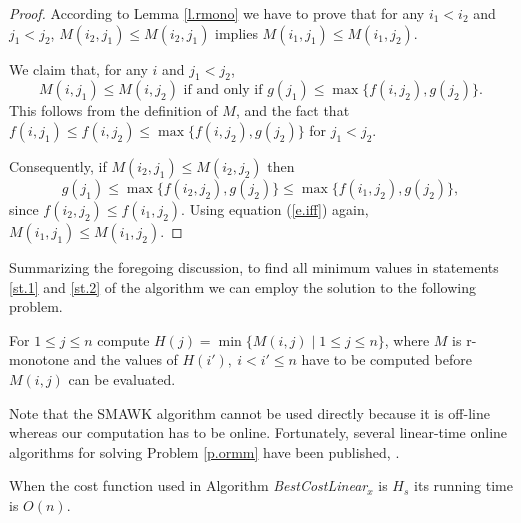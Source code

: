 \begin{proof}
	According to Lemma \ref{l.rmono} we have to prove that for any $i_1<i_2$ and $j_1<j_2$,
	 $M(i_2,j_1)\leq M(i_2,j_1)$ implies $M(i_1,j_1)\leq M(i_1,j_2)$.

We claim that, for any $i$ and  $j_1<j_2$, 
\begin{equation}\label{e.iff}
M(i,j_1)\leq M(i,j_2) \mbox{ if and only if }  g(j_1)\leq \max \{ f(i, j_2),g(j_2)\}. 
\end{equation}
This follows from the definition of $M$, and the fact that 
 $f(i, j_1)\leq f(i, j_2)\leq \max \{ f(i, j_2),g(j_2)\} $ for $j_1 < j_2$.

Consequently,  if $M(i_2,j_1)\leq M(i_2,j_2)$ then
$$ g(j_1)\leq \max \{ f(i_2,j_2), g( j_2)\}\leq \max \{ f(i_1,j_2), g( j_2)\},$$
since $ f(i_2, j_2) \leq f(i_1, j_2)$.
Using equation (\ref{e.iff}) again, $M(i_1,j_1)\leq M(i_1,j_2)$.
\end{proof}
Summarizing the foregoing discussion, to find all minimum values in statements \ref{st.1} and \ref{st.2} of the algorithm we can employ the solution to the following problem.
\begin{problem}\label{p.ormm}
		For $1\leq j \leq n$ compute $H(j)=\min \{M(i,j) \mid 1\leq j \leq n\}$, where 
		$M$ is r-monotone and
	the values of $H(i'),\ i < i' \leq n$ have to be computed before $M(i,j)$ can be evaluated.
\end{problem}
Note that the SMAWK algorithm cannot
be used directly because it is off-line whereas our computation has to be online.
Fortunately, several linear-time online algorithms for solving Problem \ref{p.ormm} have been published, 
\cite{klawe89,larmore91,galil92,barnoy09}.

\begin{theorem}\label{t.linear-s}
	When the cost function used in Algorithm \emph{BestCostLinear}$_x$ is $H_s$ its running time is $O(n)$.
\end{theorem}

\
